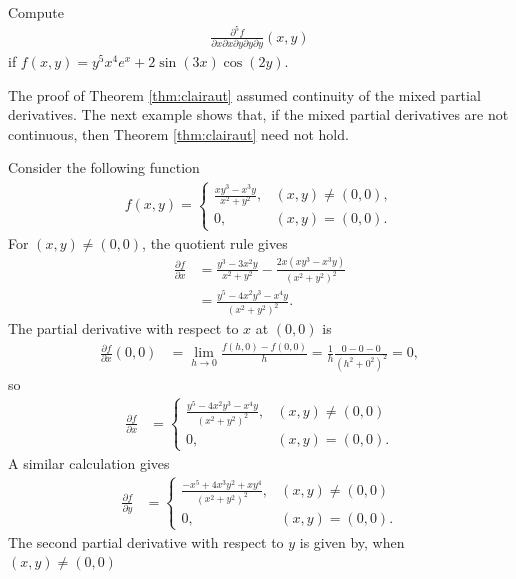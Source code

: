 \documentclass[12pt,letterpaper,reqno]{article}
\numberwithin{equation}{section}
\begin{document}
{\begin{exercise}
Compute 
\begin{align*}
	\frac{\partial^5 f}{\partial x \partial x \partial y \partial y \partial y}(x,y)
\end{align*}
if $f(x,y)=y^5x^4e^x+2\sin(3x)\cos(2y)$.	
\end{exercise}

The proof of Theorem \ref{thm:clairaut} assumed continuity of the mixed partial derivatives. The next example shows that, if the mixed partial derivatives are not continuous, then Theorem \ref{thm:clairaut} need not hold.

\begin{example}
Consider the following function
\begin{align*}
	f(x,y)=\begin{cases}
		\frac{xy^3-x^3y}{x^2+y^2}, &(x,y)\neq (0,0), \\
		0, &(x,y)=(0,0).
	\end{cases}
\end{align*}
For $(x,y) \neq (0,0)$, the quotient rule gives
\begin{align*}
\frac{\partial f}{\partial x}&=\frac{y^3-3x^2y}{x^2+y^2}-\frac{2x(xy^3-x^3y)}{(x^2+y^2)^2} \\
&=\frac{y^5-4x^2y^3-x^4y}{(x^2+y^2)^2}.
\end{align*}
The partial derivative with respect to $x$ at $(0,0)$ is 
\begin{align*}
	\frac{\partial f}{\partial x}(0,0)&=\lim_{h \to 0}\frac{f(h,0)-f(0,0)}{h}=\frac{1}{h}\frac{0-0-0}{(h^2+0^2)^2}=0,
\end{align*}	
so 
\begin{align*}
	\frac{\partial f}{\partial x}&=
	\begin{cases}
	\frac{y^5-4x^2y^3-x^4y}{(x^2+y^2)^2}, &(x,y)\neq (0,0) \\
		0, &(x,y)=(0,0).
	\end{cases}
\end{align*}
A similar calculation gives
\begin{align*}
	\frac{\partial f}{\partial y}&=\begin{cases}
		\frac{-x^5+4x^3y^2+xy^4}{(x^2+y^2)^2}, &(x,y)\neq (0,0) \\
		0, &(x,y)=(0,0).
	\end{cases}
\end{align*}
The second partial derivative with respect to $y$ is given by, when $(x,y) \neq (0,0)$
\begin{align*}

\end{align*}
\end{example}}
\end{document}

